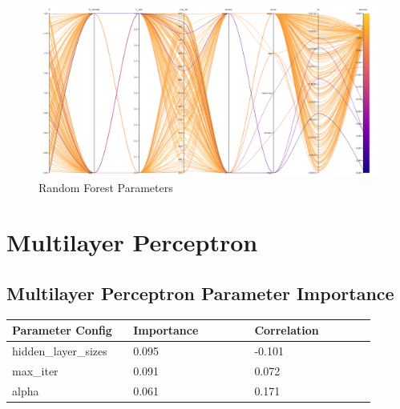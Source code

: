 \documentclass[11pt]{article}
\begin{document}
\begin{figure}[h]
    \caption {Random Forest Parameters} \label{ParallelCoordLC}
    \centering 
    \includegraphics[width = \textwidth, height = \textwidth, keepaspectratio]{Images/LC ParallelCoordGraph.png}
\end{figure}

  \FloatBarrier
\newpage
\section{Multilayer Perceptron}

\subsection{Multilayer Perceptron Parameter Importance}
  \begin{table}[ht]
    \centering
    \begin{tabular}{|p{0.3\linewidth} | p{0.3\linewidth}| p{0.3\linewidth}|} 
      \hline
      \textbf{Parameter Config}  & \textbf{Importance} & \textbf{Correlation} \\ \hline
        hidden\_layer\_sizes & 0.095 & -0.101 \\ \hline
        max\_iter & 0.091 & 0.072 \\ \hline
        alpha & 0.061 & 0.171 \\ \hline
    \end{tabular}
  \end{table}\label{MLP_ParamImp1}
\end{document}
